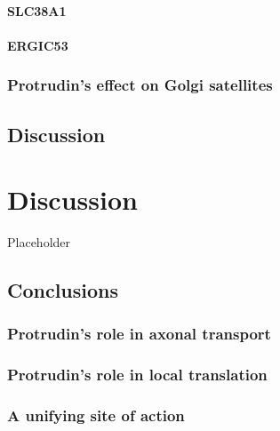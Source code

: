 \documentclass[
  12pt,
  a4paper,
]{book}
\begin{document}
\hypertarget{slc38a1}{%
\subsubsection{SLC38A1}\label{slc38a1}}

\hypertarget{ergic53}{%
\subsubsection{ERGIC53}\label{ergic53}}

\hypertarget{protrudins-effect-on-golgi-satellites}{%
\subsection{Protrudin's effect on Golgi satellites}\label{protrudins-effect-on-golgi-satellites}}

\hypertarget{discussion-1}{%
\section{Discussion}\label{discussion-1}}

\hypertarget{DISCUSSION}{%
\chapter*{Discussion}\label{DISCUSSION}}

Placeholder

\hypertarget{conclusions}{%
\section{Conclusions}\label{conclusions}}

\hypertarget{protrudins-role-in-axonal-transport}{%
\subsection{Protrudin's role in axonal transport}\label{protrudins-role-in-axonal-transport}}

\hypertarget{protrudins-role-in-local-translation}{%
\subsection{Protrudin's role in local translation}\label{protrudins-role-in-local-translation}}

\hypertarget{a-unifying-site-of-action}{%
\subsection{A unifying site of action}\label{a-unifying-site-of-action}}
\end{document}
